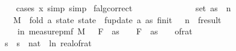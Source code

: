 \begin{isabellebody}
%
\isadelimproof
\ \ %
\endisadelimproof
%
\isatagproof
{}\isamarkupfalse%
\ {\isacharparenleft}{\kern0pt}cases\ x{\isacharcomma}{\kern0pt}\ simp{\isacharcomma}{\kern0pt}\ simp{\isacharparenright}{\kern0pt}%
\endisatagproof
{\isafoldproof}%
%
\isadelimproof
\isanewline
%
\endisadelimproof
\isanewline
{}\isamarkupfalse%
\ f{}{\isacharunderscore}{\kern0pt}alg{\isacharunderscore}{\kern0pt}correct{\isacharcolon}{\kern0pt}\isanewline
\ \ \ {\isachardoublequoteopen}{\isasymepsilon}\ {\isasymin}\ {\isacharbraceleft}{\kern0pt}{}{\isacharless}{\kern0pt}{\isachardot}{\kern0pt}{\isachardot}{\kern0pt}{\isacharless}{\kern0pt}{}{\isacharbraceright}{\kern0pt}{\isachardoublequoteclose}\isanewline
\ \ \ {\isachardoublequoteopen}{\isasymdelta}\ {\isasymin}\ {\isacharbraceleft}{\kern0pt}{}{\isacharless}{\kern0pt}{\isachardot}{\kern0pt}{\isachardot}{\kern0pt}{\isacharless}{\kern0pt}{}{\isacharbraceright}{\kern0pt}{\isachardoublequoteclose}\isanewline
\ \ \ {\isachardoublequoteopen}set\ as\ {\isasymsubseteq}\ {\isacharbraceleft}{\kern0pt}{}{\isachardot}{\kern0pt}{\isachardot}{\kern0pt}{\isacharless}{\kern0pt}n{\isacharbraceright}{\kern0pt}{\isachardoublequoteclose}\isanewline
\ \ \ {\isachardoublequoteopen}M\ {\isasymequiv}\ fold\ {\isacharparenleft}{\kern0pt}{\isasymlambda}a\ state{\isachardot}{\kern0pt}\ state\ {\isasymbind}\ f{}{\isacharunderscore}{\kern0pt}update\ a{\isacharparenright}{\kern0pt}\ as\ {\isacharparenleft}{\kern0pt}f{}{\isacharunderscore}{\kern0pt}init\ {\isasymdelta}\ {\isasymepsilon}\ n{\isacharparenright}{\kern0pt}\ {\isasymbind}\ f{}{\isacharunderscore}{\kern0pt}result{\isachardoublequoteclose}\isanewline
\ \ \ {\isachardoublequoteopen}{\isasymP}{\isacharparenleft}{\kern0pt}{\isasymomega}\ in\ measure{\isacharunderscore}{\kern0pt}pmf\ M{\isachardot}{\kern0pt}\ {\isasymbar}{\isasymomega}\ {\isacharminus}{\kern0pt}\ F\ {}\ as{\isasymbar}\ {\isasymle}\ {\isasymdelta}\ {\isacharasterisk}{\kern0pt}\ F\ {}\ as{\isacharparenright}{\kern0pt}\ {\isasymge}\ {}\ {\isacharminus}{\kern0pt}\ of{\isacharunderscore}{\kern0pt}rat\ {\isasymepsilon}{\isachardoublequoteclose}\isanewline
%
\isadelimproof
%
\endisadelimproof
%
\isatagproof
{}\isamarkupfalse%
\ {\isacharminus}{\kern0pt}\isanewline
\ \ \isamarkupfalse%
\ s\ \ {\isachardoublequoteopen}s\ {\isacharequal}{\kern0pt}\ nat\ {\isasymlceil}{\isacharminus}{\kern0pt}{\isacharparenleft}{\kern0pt}{}{}{\isacharasterisk}{\kern0pt}\ ln\ {\isacharparenleft}{\kern0pt}real{\isacharunderscore}{\kern0pt}of{\isacharunderscore}{\kern0pt}rat\ {\isasymepsilon}{\isacharparenright}{\kern0pt}{\isacharparenright}{\kern0pt}{\isasymrceil}{\isachardoublequoteclose}\isanewline

\end{isabellebody}
